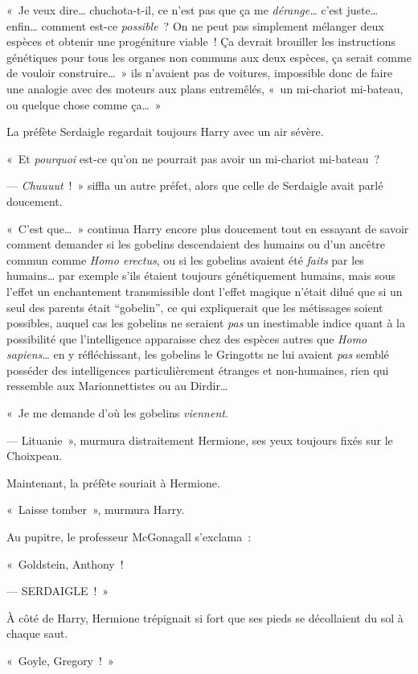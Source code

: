 «~Je veux dire… chuchota-t-il, ce n'est pas que ça me \emph{dérange…} c'est juste… enfin… comment est-ce \emph{possible}~? On ne peut pas simplement mélanger deux espèces et obtenir une progéniture viable~! Ça devrait brouiller les instructions génétiques pour tous les organes non communs aux deux espèces, ça serait comme de vouloir construire…~» ils n'avaient pas de voitures, impossible donc de faire une analogie avec des moteurs aux plans entremêlés, «~un mi-chariot mi-bateau, ou quelque chose comme ça…~»

La préfète Serdaigle regardait toujours Harry avec un air sévère.

«~Et \emph{pourquoi} est-ce qu'on ne pourrait pas avoir un mi-chariot mi-bateau~?

--- \emph{Chuuuut}~!~» siffla un autre préfet, alors que celle de Serdaigle avait parlé doucement.

«~C'est que…~» continua Harry encore plus doucement tout en essayant de savoir comment demander si les gobelins descendaient des humains ou d'un ancêtre commun comme \emph{Homo erectus}, ou si les gobelins avaient été \emph{faits} par les humains… par exemple s'ils étaient toujours génétiquement humains, mais sous l'effet un enchantement transmissible dont l'effet magique n'était dilué que si un seul des parents était “gobelin”, ce qui expliquerait que les métissages soient possibles, auquel cas les gobelins ne seraient \emph{pas} un inestimable indice quant à la possibilité que l'intelligence apparaisse chez des espèces autres que \emph{Homo sapiens}… en y réfléchissant, les gobelins le Gringotts ne lui avaient \emph{pas} semblé posséder des intelligences particulièrement étranges et non-humaines, rien qui ressemble aux Marionnettistes ou au Dirdir…

«~Je me demande d'où les gobelins \emph{viennent}.

--- Lituanie~», murmura distraitement Hermione, ses yeux toujours fixés sur le Choixpeau.

Maintenant, la préfète souriait à Hermione.

«~Laisse tomber~», murmura Harry.

Au pupitre, le professeur McGonagall s'exclama~:

«~Goldstein, Anthony~!

--- SERDAIGLE~!~»

À côté de Harry, Hermione trépignait si fort que ses pieds se décollaient du sol à chaque saut.

«~Goyle, Gregory~!~»

